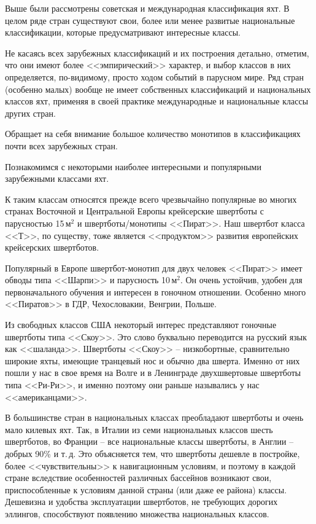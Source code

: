 \documentclass[a4paper, 12pt, twoside, final]{scrbook}
\begin{document}
Выше были рассмотрены советская и международная классификация яхт.
В целом ряде стран существуют свои, более или менее развитые национальные
классификации, которые предусматривают интересные классы.

Не касаясь всех зарубежных классификаций и их построения детально,
отметим, что они имеют более <<эмпирический>> характер, и выбор классов
в них определяется, по-видимому, просто ходом событий в парусном мире.
Ряд стран (особенно малых) вообще не имеет собственных классификаций
и национальных классов яхт, применяя в своей практике международные
и национальные классы других стран.

Обращает на себя внимание большое количество монотипов в классификациях
почти всех зарубежных стран.

Познакомимся с некоторыми наиболее интересными и популярными зарубежными
классами яхт.

К таким классам относятся прежде всего чрезвычайно популярные во многих
странах Восточной и Центральной Европы крейсерские швертботы с парусностью
15\,$\mbox{м}^2$ и швертботы\-/монотипы <<Пират>>. Наш швертбот класса <<Т>>,
по существу, тоже является <<продуктом>> развития европейских крейсерских
швертботов.

Популярный в Европе швертбот-монотип для двух человек <<Пират>> имеет
обводы типа <<Шарпи>> и парусность 10\,$\mbox{м}^2$. Он очень устойчив, удобен
для первоначального обучения и интересен в гоночном отношении. Особенно
много <<Пиратов>> в ГДР, Чехословакии, Венгрии, Польше.

Из свободных классов США некоторый интерес представляют гоночные швертботы
типа <<Скоу>>. Это слово буквально переводится на русский язык как <<шаланда>>.
Швертботы <<Скоу>> \--- низкобортные, сравнительно широкие яхты, имеющие
транцевый нос и обычно два шверта. Именно от них пошли у нас в свое
время на Волге и в Ленинграде двухшвертовые швертботы типа <<Ри-Ри>>,
и именно поэтому они раньше назывались у нас <<американцами>>.

В большинстве стран в национальных классах преобладают швертботы и
очень мало килевых яхт. Так, в Италии из семи национальных классов
шесть швертботов, во Франции \--- все национальные классы швертботы,
в Англии \--- добрых 90\% и т.\,д. Это объясняется тем, что швертботы
дешевле в постройке, более <<чувствительны>> к навигационным условиям,
и поэтому в каждой стране вследствие особенностей различных бассейнов
возникают свои, приспособленные к условиям данной страны (или даже
ее района) классы. Дешевизна и удобства эксплуатации швертботов, не
требующих дорогих эллингов, способствуют появлению множества национальных
классов.
\end{document}
